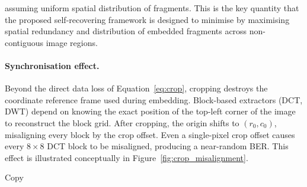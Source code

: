 \documentclass[12pt,a4paper,oneside]{report}
\begin{document}
	assuming uniform spatial distribution of fragments. This is the key quantity that the proposed
	self-recovering framework is designed to minimise by maximising spatial redundancy and
	distribution of embedded fragments across non-contiguous image regions.
	
	\paragraph{Synchronisation effect.}
	Beyond the direct data loss of Equation~\eqref{eq:crop}, cropping destroys the coordinate
	reference frame used during embedding. Block-based extractors (DCT, DWT) depend on knowing
	the exact position of the top-left corner of the image to reconstruct the block grid. After
	cropping, the origin shifts to $(r_0, c_0)$, misaligning every block by the crop offset. Even
	a single-pixel crop offset causes every $8 \times 8$ DCT block to be misaligned, producing
	a near-random BER. This effect is illustrated conceptually in
	Figure~\ref{fig:crop_misalignment}.
	
	
	Copy
	
\end{document}
